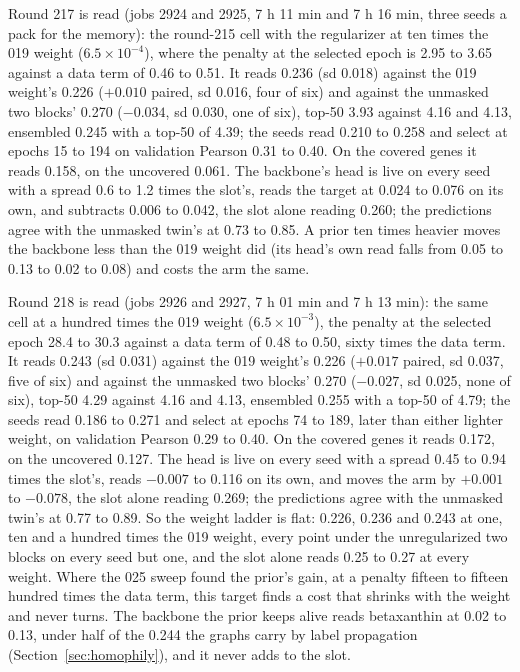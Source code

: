 Round 217 is read (jobs 2924 and 2925, 7 h 11 min and 7 h 16 min, three seeds a pack
for the memory): the round-215 cell with the regularizer at ten times the 019 weight
($6.5 \times 10^{-4}$), where the penalty at the selected epoch is 2.95 to 3.65 against
a data term of 0.46 to 0.51. It reads 0.236 (sd 0.018) against the 019 weight's 0.226
($+0.010$ paired, sd 0.016, four of six) and against the unmasked two blocks' 0.270
($-0.034$, sd 0.030, one of six), top-50 3.93 against 4.16 and 4.13, ensembled 0.245
with a top-50 of 4.39; the seeds read 0.210 to 0.258 and select at epochs 15 to 194 on
validation Pearson 0.31 to 0.40. On the covered genes it reads 0.158, on the uncovered
0.061. The backbone's head is live on every seed with a spread 0.6 to 1.2 times the
slot's, reads the target at 0.024 to 0.076 on its own, and subtracts 0.006 to 0.042,
the slot alone reading 0.260; the predictions agree with the unmasked twin's at 0.73
to 0.85. A prior ten times heavier moves the backbone less than the 019 weight did
(its head's own read falls from 0.05 to 0.13 to 0.02 to 0.08) and costs the arm the
same.

Round 218 is read (jobs 2926 and 2927, 7 h 01 min and 7 h 13 min): the same cell at a
hundred times the 019 weight ($6.5 \times 10^{-3}$), the penalty at the selected epoch
28.4 to 30.3 against a data term of 0.48 to 0.50, sixty times the data term. It reads
0.243 (sd 0.031) against the 019 weight's 0.226 ($+0.017$ paired, sd 0.037, five of
six) and against the unmasked two blocks' 0.270 ($-0.027$, sd 0.025, none of six),
top-50 4.29 against 4.16 and 4.13, ensembled 0.255 with a top-50 of 4.79; the seeds
read 0.186 to 0.271 and select at epochs 74 to 189, later than either lighter weight,
on validation Pearson 0.29 to 0.40. On the covered genes it reads 0.172, on the
uncovered 0.127. The head is live on every seed with a spread 0.45 to 0.94 times the
slot's, reads $-0.007$ to 0.116 on its own, and moves the arm by $+0.001$ to $-0.078$,
the slot alone reading 0.269; the predictions agree with the unmasked twin's at 0.77
to 0.89. So the weight ladder is flat: 0.226, 0.236 and 0.243 at one, ten and a
hundred times the 019 weight, every point under the unregularized two blocks on every
seed but one, and the slot alone reads 0.25 to 0.27 at every weight. Where the 025
sweep found the prior's gain, at a penalty fifteen to fifteen hundred times the data
term, this target finds a cost that shrinks with the weight and never turns. The
backbone the prior keeps alive reads betaxanthin at 0.02 to 0.13, under half of the
0.244 the graphs carry by label propagation (Section~\ref{sec:homophily}), and it never
adds to the slot.

